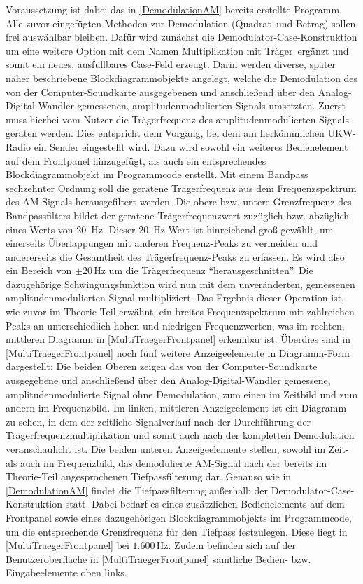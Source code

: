 \documentclass[
a4paper,
12pt,
pagesize,
ngerman
]{scrartcl}
\begin{document}
	\noindent Voraussetzung ist dabei das in \cref{DemodulationAM} bereits erstellte Programm.
	Alle zuvor eingefügten Methoden zur Demodulation (\glqq Quadrat\grqq\ und \glqq Betrag\grqq ) sollen frei auswählbar bleiben.
	Dafür wird zunächst die Demodulator-Case-Konstruktion um eine weitere Option mit dem Namen \glqq Multiplikation mit Träger\grqq\ ergänzt und somit ein neues, ausfüllbares Case-Feld erzeugt.
	Darin werden diverse, später näher beschriebene Blockdiagrammobjekte angelegt, welche die Demodulation des von der Computer-Soundkarte ausgegebenen und anschließend über den Analog-Digital-Wandler gemessenen, amplitudenmodulierten Signals umsetzten.
	Zuerst muss hierbei vom Nutzer die Trägerfrequenz des amplitudenmodulierten Signals geraten werden.
	Dies entspricht dem Vorgang, bei dem am herkömmlichen UKW-Radio ein Sender eingestellt wird.
	Dazu wird sowohl ein weiteres Bedienelement auf dem Frontpanel hinzugefügt, als auch ein entsprechendes Blockdiagrammobjekt im Programmcode erstellt.
	Mit einem Bandpass sechzehnter Ordnung soll die geratene Trägerfrequenz aus dem Frequenzspektrum des AM-Signals herausgefiltert werden. 
	Die obere bzw. untere Grenzfrequenz des Bandpassfilters bildet der geratene Trägerfrequenzwert zuzüglich bzw. abzüglich eines Werts von \SI{20}{\hertz}. 
	Dieser \SI{20}{\hertz}-Wert ist hinreichend groß gewählt, um einerseits Überlappungen mit anderen Frequenz-Peaks zu vermeiden und andererseits die Gesamtheit des Trägerfrequenz-Peaks zu erfassen. 
	Es wird also ein Bereich von $\pm 20\,$Hz um die Trägerfrequenz \enquote{herausgeschnitten}. 
	Die dazugehörige Schwingungsfunktion wird nun mit dem unveränderten, gemessenen amplitudenmodulierten Signal multipliziert. 
	Das Ergebnis dieser Operation ist, wie zuvor im Theorie-Teil erwähnt, ein breites Frequenzspektrum mit zahlreichen Peaks an unterschiedlich hohen und niedrigen Frequenzwerten, was im rechten, mittleren Diagramm in \cref{MultiTraegerFrontpanel} erkennbar ist.
	Überdies sind in \cref{MultiTraegerFrontpanel} noch fünf weitere Anzeigeelemente in Diagramm-Form dargestellt: Die beiden Oberen zeigen das von der Computer-Soundkarte ausgegebene und anschließend über den Analog-Digital-Wandler gemessene, amplitudenmodulierte Signal ohne Demodulation, zum einen im Zeitbild und zum andern im Frequenzbild.
	Im linken, mittleren Anzeigeelement ist ein Diagramm zu sehen, in dem der zeitliche Signalverlauf nach der Durchführung der Trägerfrequenzmultiplikation und somit auch nach der kompletten Demodulation veranschaulicht ist. 
	Die beiden unteren Anzeigeelemente stellen, sowohl im Zeit- als auch im Frequenzbild, das demodulierte AM-Signal nach der bereits im Theorie-Teil angesprochenen Tiefpassfilterung dar. 
	Genauso wie in \cref{DemodulationAM} findet die Tiefpassfilterung außerhalb der Demodulator-Case-Konstruktion statt. 
	Dabei bedarf es eines zusätzlichen Bedienelements auf dem Frontpanel sowie eines dazugehörigen Blockdiagrammobjekts im Programmcode, um die entsprechende Grenzfrequenz für den Tiefpass festzulegen. 
	Diese liegt in \cref{MultiTraegerFrontpanel} bei $1.600\,$Hz. 
	Zudem befinden sich auf der Benutzeroberfläche in \cref{MultiTraegerFrontpanel} sämtliche Bedien- bzw. Eingabeelemente oben links.
	
\end{document}
